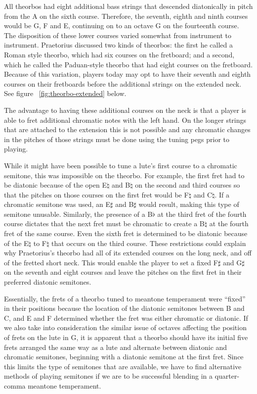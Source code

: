 All theorbos had eight additional bass strings that descended diatonically in
pitch from the A on the sixth course.  Therefore, the seventh, eighth and ninth
courses would be G, F and E, continuing on to an octave G on the fourteenth
course.  The disposition of these lower courses varied somewhat from instrument
to instrument.  Praetorius discussed two kinds of theorbos: the first he called
a Roman style theorbo, which had six courses on the fretboard; and a second,
which he called the Paduan-style theorbo that had eight courses on the
fretboard. \autocite[59]{MP:1}  Because of this variation, players today may
opt to have their seventh and eighth courses on their fretboards before the
additional strings on the extended neck. See figure ~\ref{fig:theorbo-extended}
below.

The advantage to having these additional courses on the neck is that a player is
able to fret additional chromatic notes with the left hand.  On the longer
strings that are attached to the extension this is not possible and any
chromatic changes in the pitches of those strings must be done using the tuning
pegs prior to playing.

While it might have been possible to tune a lute's first course to a chromatic semitone,
this was impossible on the theorbo. For example, the first fret had to be diatonic because
of the open E$\natural$ and B$\natural$ on the second and third courses so that the
pitches on those courses on the first fret would be F$\natural$ and C$\natural$.  If a
chromatic semitone was used, an E$\sharp$ and B$\sharp$ would result, making this type of
semitone unusable. Similarly, the presence of a B$\flat$ at the third fret of the fourth
course dictates that the next fret must be chromatic to create a B$\natural$ at the fourth
fret of the same course. Even the sixth fret is determined to be diatonic because of the
E$\natural$ to F$\natural$ that occurs on the third course.  These restrictions could
explain why Praetorius's theorbo had all of its extended courses on the long neck, and
off of the fretted short neck.  This would enable the player to set a fixed F$\sharp$ and 
G$\sharp$ on the seventh and eight courses and leave the pitches on the first fret in
their preferred diatonic semitones. 

Essentially, the frets of a theorbo tuned to meantone temperament were ``fixed'' in
their positions because the location of the diatonic semitones between B and C, and E
and F determined whether the fret was either chromatic or diatonic.  If we also take into
consideration the similar issue of octaves affecting the position of frets on the lute
in G, it is apparent that a theorbo should have its initial five frets arranged the
same way as a lute and alternate between diatonic and chromatic semitones, beginning
with a diatonic semitone at the first fret.  Since this limits the type of semitones
that are available, we have to find alternative methods of playing semitones if we are
to be successful blending in a quarter-comma meantone temperament.


